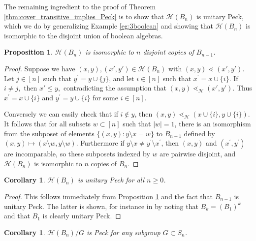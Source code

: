 \documentclass[10 pt]{amsart}
\theoremstyle{plain}
\newtheorem{prop}[thm]{Proposition}
\newtheorem{cor}[thm]{Corollary}
\theoremstyle{definition}
\theoremstyle{remark}
\numberwithin{equation}{section}
\begin{document}
The remaining ingredient to the proof of Theorem \ref{thm:cover_transitive_implies_Peck} is to show that $\mathcal{H}(B_n)$ is unitary Peck, which we do by generalizing Example \ref{eg:3boolean} and showing that $\mathcal{H}(B_n)$ is isomorphic to the disjoint union of boolean algebras.

\begin{prop}\label{prop:computing_HBn}
$\mathcal{H}(B_n)$ is isomorphic to $n$ disjoint copies of $B_{n-1}$.
\end{prop}

\begin{proof}

Suppose we have $(x, y),(x', y') \in \mathcal H(B_n)$ with $(x, y) \lessdot (x', y').$ Let $j\in [n]$ such that $y^\prime = y\cup\{j\}$, and let $i\in [n]$ such that $x^\prime = x\cup \{i\}$. If $i \ne j,$ then $x' \leq y,$ contradicting the assumption that $(x, y) \lessdot_{\mathcal H} (x', y').$ Thus $x^\prime = x\cup\{i\}$ and $y^\prime = y\cup\{i\}$ for some $i\in [n]$.

Conversely we can easily check that if $i\not\in y$, then $(x, y)\lessdot_{\mathcal{H}} (x\cup\{i\}, y\cup\{i\})$.  It follows that for all subsets $w \subset [n]$ such that $|w| = 1$, there is an isomorphism from the subposet of elements $\{(x, y)\colon y\setminus x = w\}$ to $B_{n-1}$ defined by $(x,y)\mapsto (x\setminus w,y\setminus w)$.  Furthermore if $y\setminus x \ne y^\prime \setminus x^\prime$, then $(x, y)$ and $(x^\prime, y^\prime)$ are incomparable, so these subposets indexed by $w$ are pairwise disjoint, and $\mathcal H(B_n)$ is isomorphic to $n$ copies of $B_{n}$.
\end{proof}

\begin{cor}\label{cor:HBn_unitary_peck}
$\mathcal H(B_n)$ is unitary Peck for all $n\ge 0$.
\end{cor}

\begin{proof}
This follows immediately from Proposition \ref{prop:computing_HBn} and the fact that $B_{n-1}$ is unitary Peck.  The latter is shown, for instance in \cite[Theorem 2a]{quotients_stanley} by noting that $B_k = (B_1)^k$ and that $B_1$ is clearly unitary Peck.
\end{proof}

\begin{cor}\label{cor:quotients_of_HBn_peck}
$\mathcal H(B_n)/G$ is Peck for any subgroup $G\subset S_n$.
\end{cor}
\end{document}
